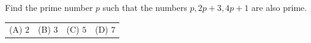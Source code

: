 Find the prime number $p$ such that the numbers $p, 2p+3, 4p+1$ are also prime.



\begin{tabular}{llll}
(A) $2$ & (B) $3$ & (C) $5$ & (D) $7$
\end{tabular}
